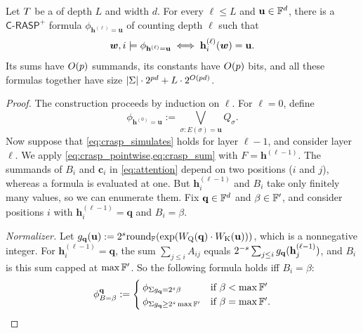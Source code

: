 \begin{theorem} \label{thm:transformer_to_crasp}
Let ${T}$ be a \frtfr{} of depth $L$ and width $d$. For every $\ell\leq L$ and $\mathbf{u}\in\mathbb{F}^d$, there is a
$\mathsf{C\text{-}RASP}^+$ formula $\phi_{\mathbf{h}^{(\ell)}=\mathbf{u}}$ of counting depth $\ell$ such that
\begin{equation}
{{\boldsymbol{w}}},i\models\phi_{\mathbf{h}^{(\ell)}=\mathbf{u}} \iff \mathbf{h}^{(\ell)}_i({{\boldsymbol{w}}})=\mathbf{u}.
\label{eq:crasp_simulates}
\end{equation}
Its sums have $O({p})$ summands, its constants have $O({p})$ bits,
and all these formulas together have size $|{{ \Sigma}}|\cdot2^{{p} d}+L\cdot2^{O({p} d)}$.
\end{theorem}

\begin{proof}
The construction proceeds by induction on $\ell$. For $\ell=0$, define
\[
\phi_{\mathbf{h}^{(0)}=\mathbf{u}} := \bigvee_{\sigma\colon E(\sigma)=\mathbf{u}}Q_\sigma.
\]
Now suppose that \cref{eq:crasp_simulates} holds for layer $\ell-1$, and consider layer $\ell$.
We apply \cref{eq:crasp_pointwise,eq:crasp_sum} with $F=\mathbf{h}^{(\ell-1)}$.
The summands of $B_i$ and $\mathbf{c}_i$ in \cref{eq:attention} depend on two positions ($i$ and $j$),
whereas a formula is evaluated at one. But $\mathbf{h}^{(\ell-1)}_i$ and $B_i$ take only finitely many values,
so we can enumerate them. Fix $\mathbf{q}\in\mathbb{F}^d$ and $\beta\in\mathbb{F}'$, and consider positions $i$ with
$\mathbf{h}^{(\ell-1)}_i=\mathbf{q}$ and $B_i=\beta$.

\emph{Normalizer.} Let $g_{\mathbf{q}}(\mathbf{u}):=2^{{s}}\textnormal{round}_{\mathbb{F}}(\exp(W_{\textnormal{Q}}(\mathbf{q})\cdot W_{\textnormal{K}}(\mathbf{u})))$, which is a nonnegative integer.
For $\mathbf{h}^{(\ell-1)}_i=\mathbf{q}$, the sum $\sum_{j\leq i}A_{ij}$ equals $2^{-{s}}\sum_{j\leq i}g_{\mathbf{q}}(\mathbf{h}^{(\ell-1)}_j)$, and $B_i$ is this sum capped at $\max\mathbb{F}'$.
So the following formula holds iff $B_i=\beta$:
\[
\phi^{\mathbf{q}}_{B=\beta} :=
\begin{cases}
\phi_{\Sigma g_{\mathbf{q}}=2^{{s}}\beta} & \text{if } \beta<\max\mathbb{F}'\\
\phi_{\Sigma g_{\mathbf{q}}\geq2^{{s}}\max\mathbb{F}'} & \text{if } \beta=\max\mathbb{F}'.
\end{cases}
\]


\end{proof}

